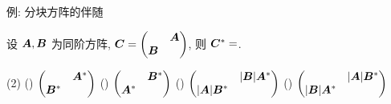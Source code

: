 \begin{frame}{例: 分块方阵的伴随}
	\onslide<+->
	\begin{exercise}
		设 ${\boldsymbol{A}},{\boldsymbol{B}}$ 为同阶方阵, ${\boldsymbol{C}}=\begin{pmatrix}
			&{\boldsymbol{A}}\\{\boldsymbol{B}}&
		\end{pmatrix}$,
		则 ${\boldsymbol{C}}^*=$.
		\begin{taskschoice}(2)
			() $\begin{pmatrix}&{\boldsymbol{A}}^*\\{\boldsymbol{B}}^*&\end{pmatrix}$
			() $\begin{pmatrix}&{\boldsymbol{B}}^*\\{\boldsymbol{A}}^*&\end{pmatrix}$
			() $\begin{pmatrix}&|{\boldsymbol{B}}|{\boldsymbol{A}}^*\\|{\boldsymbol{A}}|{\boldsymbol{B}}^*&\end{pmatrix}$
			() $\begin{pmatrix}&|{\boldsymbol{A}}|{\boldsymbol{B}}^*\\|{\boldsymbol{B}}|{\boldsymbol{A}}^*&\end{pmatrix}$
		\end{taskschoice}
	\end{exercise}
\end{frame}

